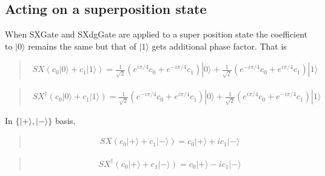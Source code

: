 \documentclass[letterpaper,10pt,english]{jupyterBook}
\begin{document}
\subsection{Acting on a superposition state}
\label{\detokenize{q1gates/sx:acting-on-a-superposition-state}}
\sphinxAtStartPar
When SXGate and SXdgGate are applied to a super position state the coefficient to \(|0\rangle\) remains the same but that of \(|1\rangle\) gets additional phase factor.  That is
\begin{quote}
\begin{equation}\label{equation:q1gates/sx:SX-on-superpos}
\begin{split}
SX \left (c_0 |0\rangle + c_1 |1\rangle\right) = \frac{1}{\sqrt{2}}\left(e^{i \pi/4} c_0 + e^{-i \pi/4} c_1\right) |0\rangle + \frac{1}{\sqrt{2}}\left(e^{-i \pi/4} c_0 + e^{i \pi/4} c_1\right) |1\rangle
\end{split}
\end{equation}\end{quote}
\begin{quote}
\begin{equation}\label{equation:q1gates/sx:SXdg-on-superpos}
\begin{split}
SX^\dagger \left (c_0 |0\rangle + c_1 |1\rangle\right) = \frac{1}{\sqrt{2}}\left(e^{-i \pi/4} c_0 + e^{i \pi/4} c_1\right) |0\rangle + \frac{1}{\sqrt{2}}\left(e^{i \pi/4} c_0 + e^{-i \pi/4} c_1\right) |1\rangle
\end{split}
\end{equation}\end{quote}

\sphinxAtStartPar
In \(\{|+\rangle,|-\rangle\}\) basis,
\begin{quote}
\begin{equation}\label{equation:q1gates/sx:SX-on-supoerpos+}
\begin{split}
SX \left(c_0 |+\rangle + c_1|-\rangle\right) = c_0 |+\rangle + i c_1 |-\rangle
\end{split}
\end{equation}\end{quote}
\begin{quote}
\begin{equation}\label{equation:q1gates/sx:SXdg-on-supoerpos+}
\begin{split}
SX^\dagger \left(c_0 |+\rangle + c_1|-\rangle\right) = c_0 |+\rangle - i c_1 |-\rangle
\end{split}
\end{equation}\end{quote}
\end{document}
